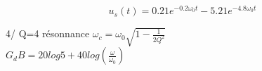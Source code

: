 \documentclass[a4paper,twocolumn,landscape]{article}
\begin{document}
\begin{equation*}
     u_s(t) = 0.21e^{-0.2\omega_0 t} -5.21 e^{-4.8\omega_0 t}
\end{equation*}

4/ Q=4 résonnance \(\omega_c = \omega_0 \sqrt{1-\frac{1}{2Q^2}}\)\\
\(G_dB = 20log5 + 40log(\frac{\omega}{\omega_0})\)\\
\end{document}
